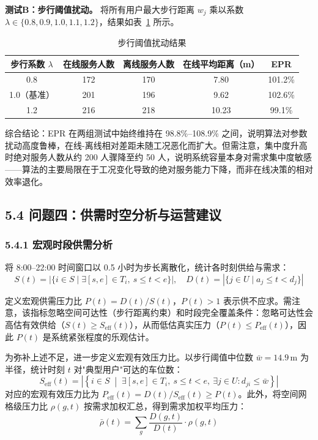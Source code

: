 \documentclass{ctexart}
\begin{document}
\textbf{测试B：步行阈值扰动。} 将所有用户最大步行距离 $w_j$ 乘以系数 $\lambda\in\{0.8,0.9,1.0,1.1,1.2\}$，结果如表~\ref{tab:stress_b} 所示。

\begin{table}[H]
  \centering
  \caption{步行阈值扰动结果}
  \label{tab:stress_b}
  \begin{tabular}{ccccc}
    \toprule
    步行系数 $\lambda$ & 在线服务人数 & 离线服务人数 & 在线平均距离（m） & EPR     \\
    \midrule
    0.8            & 172    & 170    & 7.80      & 101.2\% \\
    1.0（基准）        & 201    & 196    & 9.62      & 102.6\% \\
    1.2            & 216    & 218    & 10.23     & 99.1\%  \\
    \bottomrule
  \end{tabular}
\end{table}

综合结论：EPR 在两组测试中始终维持在 98.8\%--108.9\% 之间，说明算法对参数扰动高度鲁棒，在线-离线相对差距未随工况恶化而扩大。但需注意，集中度升高时绝对服务人数从约 200 人骤降至约 50 人，说明系统容量本身对需求集中度敏感——算法的主要局限在于工况变化导致的绝对服务能力下降，而非在线决策的相对效率退化。

\subsection*{5.4 问题四：供需时空分析与运营建议}

\subsubsection*{5.4.1 宏观时段供需分析}

将 8:00--22:00 时间窗口以 0.5 小时为步长离散化，统计各时刻供给与需求：
\begin{equation}
  S(t) = |\{i\in S \mid \exists [s,e]\in T_i,\ s\le t < e\}|,\quad
  D(t) = |\{j\in U \mid a_j\le t < d_j\}| \label{eq:sd}
\end{equation}

定义宏观供需压力比 $P(t) = D(t)/S(t)$，$P(t)>1$ 表示供不应求。需注意，该指标忽略空间可达性（步行距离约束）和时段完全覆盖条件：忽略可达性会高估有效供给（$S(t) \geq S_{\text{eff}}(t)$），从而低估真实压力（$P(t) \leq P_{\text{eff}}(t)$），因此 $P(t)$ 是系统紧张程度的乐观估计。

为弥补上述不足，进一步定义宏观有效压力比。以步行阈值中位数 $\bar{w}=14.9\,\text{m}$ 为半径，统计时刻 $t$ 对"典型用户"可达的车位数：
\begin{equation}
  S_{\text{eff}}(t) = \left|\left\{i \in S \;\middle|\; \exists [s,e] \in T_i,\ s \leq t < e,\ \exists j \in U: d_{ji} \leq \bar{w}\right\}\right| \label{eq:seff}
\end{equation}
对应的宏观有效压力比为 $P_{\text{eff}}(t) = D(t)/S_{\text{eff}}(t) \geq P(t)$。此外，将空间网格级压力比 $\rho(g,t)$ 按需求加权汇总，得到需求加权平均压力：
\begin{equation}
  \bar{\rho}(t) = \sum_{g} \frac{D(g,t)}{D(t)} \cdot \rho(g,t) \label{eq:wavg}
\end{equation}
\end{document}
